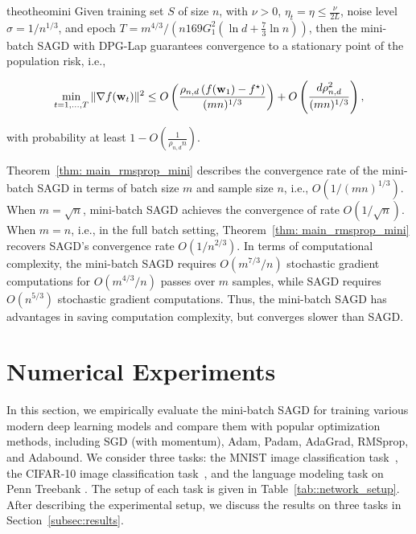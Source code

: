 \documentclass[11pt]{article}
\begin{document}
\begin{restatable}{theo}{theomini}
\label{thm: main_rmsprop_mini}
Given training set $S$ of size $n$, with $\nu >0$, $\eta_t = \eta \leq \frac{\nu}{2L}$, noise level $\sigma = 1/n^{1/3}$, and epoch $T = m^{4/3}/\left(n169G_1^2(\ln d + \frac{7}{3}\ln n)\right)$, then the mini-batch \textsc{SAGD} with DPG-Lap  guarantees convergence to a stationary point of the population risk, i.e., 
 \begin{small}
\begin{equation*}
\begin{split}
 \min_{t = 1,..., T}\|\nabla f(\mathbf{w}_t)\|^2 
 \leq O\left( \frac{\rho_{n,d} \left(f(\mathbf{w}_1) - f^\star \right)}{(mn)^{1/3}} \right)+ O \left( \frac{d \rho_{n,d}^2}{(mn)^{1/3}}\right),
 \end{split}
\end{equation*}
\end{small}
with probability at least $1-O\left(\frac{1}{\rho_{n,d} n}\right)$.
\end{restatable}

Theorem~\ref{thm: main_rmsprop_mini} 
describes the convergence rate of the mini-batch \textsc{SAGD} in terms of batch size $m$ and sample size $n$, i.e., $O(1/(mn)^{1/3})$. 
When $m = \sqrt{n}$, mini-batch \textsc{SAGD} achieves the convergence of rate $O(1/\sqrt{n})$. When $m=n$, i.e., in the full batch setting, Theorem~\ref{thm: main_rmsprop_mini} recovers \textsc{SAGD}'s convergence rate  $O(1/n^{2/3})$. 
In terms of computational complexity, the mini-batch \textsc{SAGD} 
requires $O(m^{7/3}/n)$ stochastic gradient computations for $O(m^{4/3}/n)$ passes over $m$ samples, while \textsc{SAGD} requires $O(n^{5/3})$ stochastic gradient computations. Thus, the mini-batch \textsc{SAGD} has advantages in saving computation complexity, but converges slower than \textsc{SAGD}.







\section{Numerical Experiments} \label{sec: experiment}
In this section, we empirically evaluate the mini-batch \textsc{SAGD}
for training various modern deep
learning models and compare them with popular optimization methods, including SGD (with momentum), Adam, Padam,  AdaGrad,  RMSprop, and Adabound. 
We consider three tasks: the MNIST image classification task~\citep{lebo1998}, the CIFAR-10 image
classification task~\citep{krhi2009}, and the language modeling task on Penn Treebank
\citep{mama1993}. The setup of each task is given in Table~\ref{tab::network_setup}. 
After describing the experimental setup, we discuss the results on three tasks in Section~\ref{subsec:results}.
\end{document}

